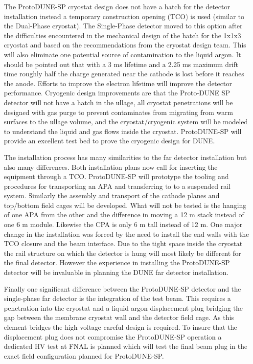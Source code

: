 The ProtoDUNE-SP cryostat design does not have a hatch for the detector installation instead a temporary construction opening (TCO) is used (similar to the Dual-Phase cryostat). The Single-Phase detector moved to this option after the difficulties encountered in the mechanical design of the hatch for the 1x1x3 cryostat and based on the recommendations from the cryostat design team.  This will also eliminate one potential source of contamination to the liquid argon. It should be pointed out that with a 3 ms lifetime and a 2.25 ms maximum drift time roughly half the charge generated near the cathode is lost before it reaches the anode. Efforts to improve the electron lifetime will improve the detector performance.  Cryogenic design improvements are that the Proto-DUNE SP detector will not have a hatch in the ullage, all cryostat penetrations will be designed with gas purge to prevent contaminates from migrating from warm surfaces to the ullage volume, and the cryostat/cryogenic system will be modeled to understand the liquid and gas flows inside the cryostat. ProtoDUNE-SP will provide an excellent test bed to prove the cryogenic design for DUNE. 

The installation process has many similarities to the far detector installation but also many differences. Both installation plans now call for inserting the equipment through a TCO. ProtoDUNE-SP will prototype the tooling and procedures for transporting an APA and transferring to to a suspended rail system. Similarly the assembly and transport of the cathode planes and top/bottom field cages will be developed. What will not be tested is the hanging of one APA from the other and the difference in moving a 12 m stack instead of one 6 m module. Likewise the CPA is only 6 m tall instead of 12 m. One major change in the installation was forced by the need to install the end walls with the TCO closure and the beam interface. Due to the tight space inside the cryostat the rail structure on which the detector is hung will most likely be different for the final detector. However the experience in installing the ProtoDUNE-SP detector will be invaluable in planning the DUNE far detector installation. 

Finally one significant difference between the ProtoDUNE-SP detector and the single-phase far detector is the integration of the test beam. This requires a penetration into the cryostat and a liquid argon displacement plug bridging the gap between the membrane cryostat wall and the detector field cage. As this element bridges the high voltage careful design is required. To insure that the displacement plug does not compromise the ProtoDUNE-SP operation a dedicated HV test at FNAL is planned which will test the final beam plug in the exact field configuration planned for ProtoDUNE-SP.

